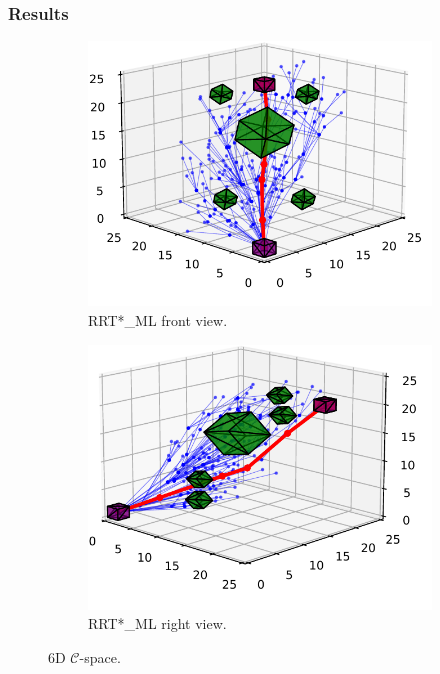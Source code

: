 \documentclass{beamer}
\begin{document}
\begin{frame}
	\frametitle{Results}	
	\begin{figure}[!ht]
		\centering  
		\begin{subfigure}[b]{0.49\textwidth}
		  \includegraphics[width=\textwidth]{figChap5/6D_RRTstarFront_ML.pdf}
		  \caption{RRT*\_ML front view.}
		\end{subfigure}
		\begin{subfigure}[b]{0.49\textwidth}
		  \includegraphics[width=\textwidth]{figChap5/6D_RRTstraRight_ML.pdf}
		  \caption{RRT*\_ML right view.}
	  \end{subfigure}
		\caption{6D $\mathcal{C}$-space.}
		\label{fig:6Dconfig-space_chap5}
	  \end{figure}
\end{frame}	
 
\end{document}
